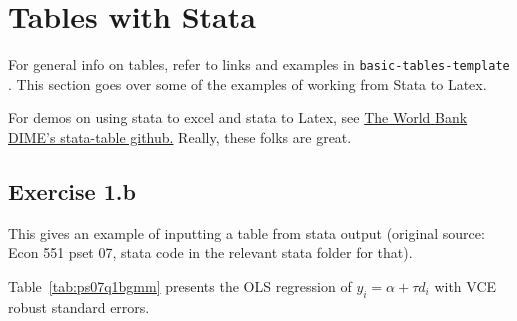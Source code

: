 \section{Tables with Stata}\label{sec:stata_tables}

For general info on tables, refer to links and examples in \verb+basic-tables-template+ . This section goes over some of the examples of working from Stata to Latex.

For demos on using stata to excel and stata to Latex, see \href{https://github.com/worldbank/stata-tables}{The World Bank DIME's stata-table github.} Really, these folks are great.


\subsection{Exercise 1.b}
This gives an example of inputting a table from stata output (original source: Econ 551 pset 07, stata code in the relevant stata folder for that).

Table~\ref{tab:ps07q1bgmm} presents the  OLS regression of $y_i = \alpha +\tau d_i$ with VCE robust standard errors.

